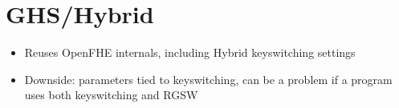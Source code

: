 \section{GHS/Hybrid}
\begin{itemize}
    \item Reuses OpenFHE internals, including Hybrid keyswitching settings
    \item Downside: parameters tied to keyswitching, can be a problem if a program uses both keyswitching and RGSW
\end{itemize}

